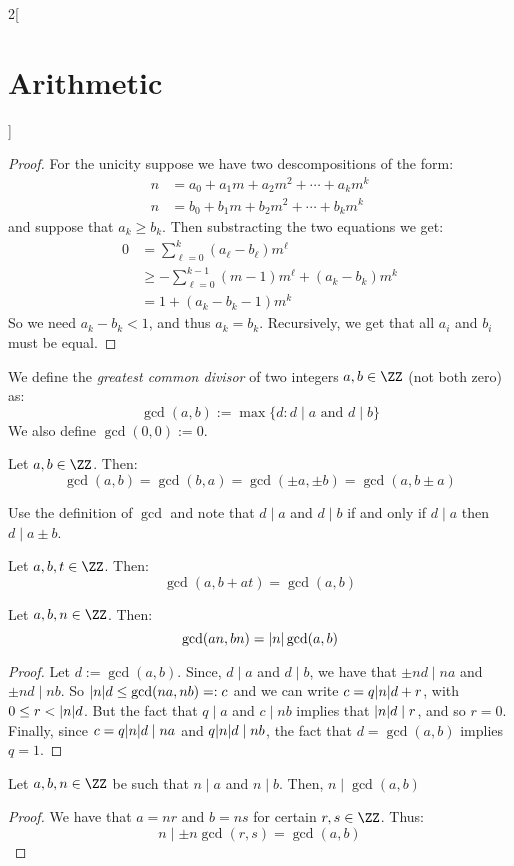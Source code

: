 \documentclass[../../../main_math.tex]{subfiles}
\begin{document}
\begin{multicols}{2}[\section{Arithmetic}]
\begin{proof}
    For the unicity suppose we have two descompositions of the form:
    \begin{align*}
      n & =a_0+a_1m+a_2m^2+\cdots +a_km^k \\
      n & =b_0+b_1m+b_2m^2+\cdots +b_km^k
    \end{align*}
    and suppose that $a_k\geq b_k$. Then substracting the two equations we get:
    \begin{align*}
      0 & =\sum_{\ell=0}^k (a_\ell-b_\ell) m^\ell                 \\
        & \geq -\sum_{\ell=0}^{k-1} (m - 1) m^\ell + (a_k-b_k)m^k \\
        & =1+ (a_k-b_k - 1)m^k
    \end{align*}
    So we need $a_k - b_k< 1$, and thus $a_k=b_k$. Recursively, we get that all $a_i$ and $b_i$ must be equal.
  \end{proof}
  \begin{definition}
    We define the \emph{greatest common divisor} of two integers $a,b\in\ZZ$ (not both zero) as: $$\gcd(a,b):=\max\{d:d\mid a\text{ and }d\mid b\}$$
    We also define $\gcd(0,0):=0$.
  \end{definition}
  \begin{lemma}
    Let $a,b\in\ZZ$. Then:
    $$\gcd(a,b)=\gcd(b,a)=\gcd(\pm a,\pm b)=\gcd(a, b\pm a)$$
  \end{lemma}
  \begin{sproof}
    Use the definition of $\gcd$ and note that $d\mid a$ and $d\mid b$ if and only if $d\mid a$ then $d\mid a\pm b$.
  \end{sproof}
  \begin{corollary}
    Let $a,b, t\in\ZZ$. Then: $$\gcd(a,b+at)=\gcd(a,b)$$
  \end{corollary}
  \begin{lemma}
    Let $a,b, n\in\ZZ$. Then: $$\gcd(an,bn)=\abs{n}\gcd(a,b)$$
  \end{lemma}
  \begin{proof}
    Let $d:=\gcd(a,b)$. Since, $d\mid a$ and $d\mid b$, we have that $\pm nd\mid na$ and $\pm nd\mid nb$. So $\abs{n}d\leq \gcd(na, nb)=:c$ and we can write $c=q\abs{n} d +r$, with $0\leq r<\abs{n}d$. But the fact that $q\mid a$ and $c\mid nb$ implies that $\abs{n}d\mid r$, and so $r=0$. Finally, since $c=q\abs{n}d\mid na$ and $q\abs{n}d\mid nb$, the fact that $d=\gcd(a,b)$ implies $q=1$.
  \end{proof}
  \begin{lemma}\label{A:gcddiv}
    Let $a,b, n\in\ZZ$ be such that $n\mid a$ and $n\mid b$. Then, $n\mid\gcd(a,b)$
  \end{lemma}
  \begin{proof}
    We have that $a=nr$ and $b=ns$ for certain $r, s\in\ZZ$. Thus:
    $$n\mid \pm n\gcd(r,s)=\gcd(a,b)$$
  \end{proof}

\end{multicols}
\end{document}
